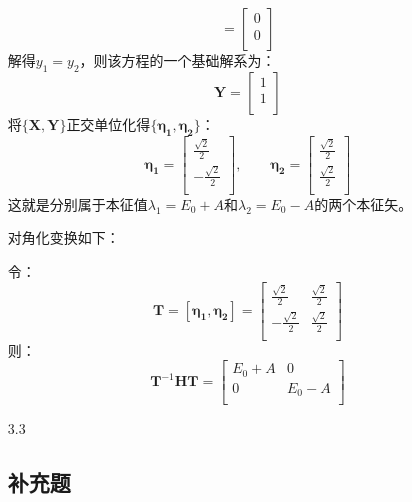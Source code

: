 \documentclass[a4paper,fontset=none]{ctexart}
\begin{document}
\begin{itemize}
\[        =
        \begin{bmatrix}
            0 \\
            0 \\
        \end{bmatrix}
        \]
        解得$y_1 = y_2$，则该方程的一个基础解系为：
        \[
        \bm{Y}
        =
        \begin{bmatrix}
            1 \\
            1 \\
        \end{bmatrix}
        \]
        将$\{\bm{X},\bm{Y}\}$正交单位化得$\{\bm{\eta_1},\bm{\eta_2}\}$：
        \[
        \bm{\eta_1}
        =
        \begin{bmatrix}
            \frac{\sqrt{2}}{2} \\
            -\frac{\sqrt{2}}{2} \\
        \end{bmatrix}
        ,\qquad
        \bm{\eta_2}
        =
        \begin{bmatrix}
            \frac{\sqrt{2}}{2} \\
            \frac{\sqrt{2}}{2} \\
        \end{bmatrix}
        \]
        这就是分别属于本征值$\lambda_1 = E_0 + A$和$\lambda_2 = E_0 - A$的两个本征矢。

        对角化变换如下：

        令：
        \[
        \bm{T} = [\bm{\eta_1}, \bm{\eta_2}]
        =
        \begin{bmatrix}
            \frac{\sqrt{2}}{2} & \frac{\sqrt{2}}{2} \\
            -\frac{\sqrt{2}}{2} & \frac{\sqrt{2}}{2} \\
        \end{bmatrix}
        \]
        则：
        \[
        \bm{T}^{-1}\bm{H}\bm{T}
        =
        \begin{bmatrix}
            E_0 + A & 0 \\
            0 & E_0 - A \\
        \end{bmatrix}
        \]

        \item[3.3]


        \subsection*{补充题}


\end{itemize}
\end{document}
